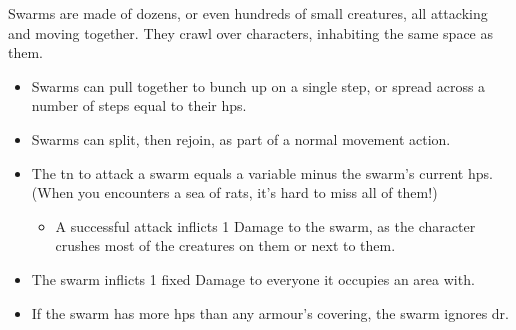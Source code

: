 Swarms are made of dozens, or even hundreds of small creatures, all attacking and moving together.
They crawl over characters, inhabiting the same space as them.

\begin{itemize}
  \item
  Swarms can pull together to bunch up on a single \gls{step}, or spread across a number of \glspl{step} equal to their \glspl{hp}.
  \item
  Swarms can split, then rejoin, as part of a normal movement action.
  \item
  The \gls{tn} to attack a swarm equals a variable minus the swarm's current \glspl{hp}.
  (When you encounters a sea of rats, it's hard to miss all of them!)
  \begin{itemize}
    \item
    A successful attack inflicts 1 Damage to the swarm, as the character crushes most of the creatures on them or next to them.
  \end{itemize}
  \item
  The swarm inflicts 1 fixed Damage to everyone it occupies an area with.
  \item
  If the swarm has more \glspl{hp} than any armour's \gls{covering}, the swarm ignores \gls{dr}.
\end{itemize}

